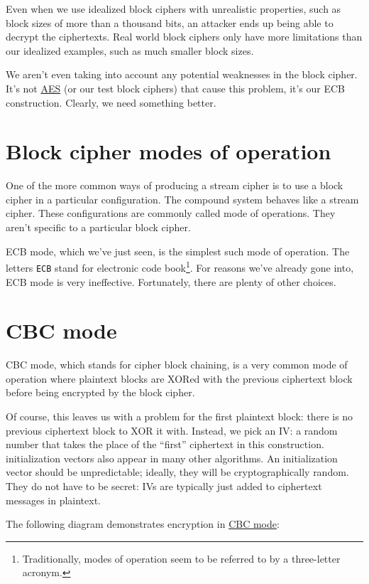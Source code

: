 \documentclass[11pt,ebook,table,dvipsnames]{memoir}
\begin{document}
Even when we use idealized block ciphers with unrealistic properties,
such as block sizes of more than a thousand bits, an attacker ends up
being able to decrypt the ciphertexts. Real world block ciphers only
have more limitations than our idealized examples, such as much
smaller block sizes.

We aren't even taking into account any potential weaknesses in the
block cipher. It's not \hyperref[AES]{AES} (or our test block ciphers) that cause this
problem, it's our ECB construction. Clearly, we need something better.
\section{Block cipher modes of operation}
\label{sec-2-3-3}

One of the more common ways of producing a \gls{stream cipher} is to
use a block cipher in a particular configuration. The compound system
behaves like a stream cipher. These configurations are commonly called
\glspl{mode of operation}. They aren't specific to a particular block
cipher.

\Gls{ECB mode}, which we've just seen, is the simplest such mode of
operation. The letters \verb~ECB~ stand for electronic code book\footnote{Traditionally, modes of operation seem to be referred to by a
three-letter acronym.}. For reasons we've already gone into, ECB mode
is very ineffective. Fortunately, there are plenty of other choices.
\section{\label{CBC-mode}CBC mode}
\label{sec-2-3-4}

\gls{CBC mode}, which stands for cipher block chaining, is a very
common \gls{mode of operation} where plaintext blocks are XORed with
the previous ciphertext block before being encrypted by the block
cipher.

Of course, this leaves us with a problem for the first plaintext
block: there is no previous ciphertext block to XOR it with. Instead,
we pick an \gls{IV}: a random number that takes the place of the
\enquote{first} ciphertext in this construction. \Glspl{initialization vector}
also appear in many other algorithms. An initialization vector should
be unpredictable; ideally, they will be cryptographically random. They
do not have to be secret: IVs are typically just added to ciphertext
messages in plaintext.

The following diagram demonstrates encryption in \hyperref[CBC-mode]{CBC mode}:
\end{document}
